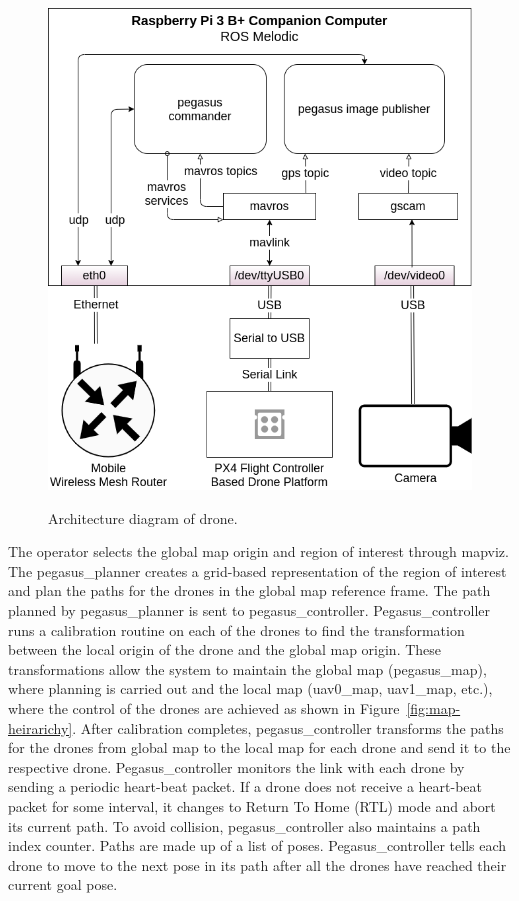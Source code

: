 \begin{figure}
	\centering
	\caption[Pegasus GCS system overview]{\small Architecture diagram of drone.}
	\includegraphics[width=5in]{figures/methodology/methodology-drone-components}
	\label{fig:drone-components}
\end{figure}


The operator selects the global map origin and region of interest through mapviz. The pegasus\_planner creates a grid-based representation of the region of interest and plan the paths for the drones in the global map reference frame.  The path planned by pegasus\_planner is sent to pegasus\_controller. Pegasus\_controller runs a calibration routine on each of the drones to find the transformation between the local origin of the drone and the global map origin. These transformations allow the system to maintain the global map (pegasus\_map), where planning is carried out and the local map (uav0\_map, uav1\_map, etc.), where the control of the drones are achieved as shown in Figure~\ref{fig:map-heirarichy}. After calibration completes, pegasus\_controller transforms the paths for the drones from global map to the local map for each drone and send it to the respective drone. Pegasus\_controller monitors the link with each drone by sending a periodic heart-beat packet. If a drone does not receive a heart-beat packet for some interval, it changes to Return To Home (RTL) mode and abort its current path. To avoid collision, pegasus\_controller also maintains a path index counter. Paths are made up of a list of poses. Pegasus\_controller tells each drone to move to the next pose in its path after all the drones have reached their current goal pose.


